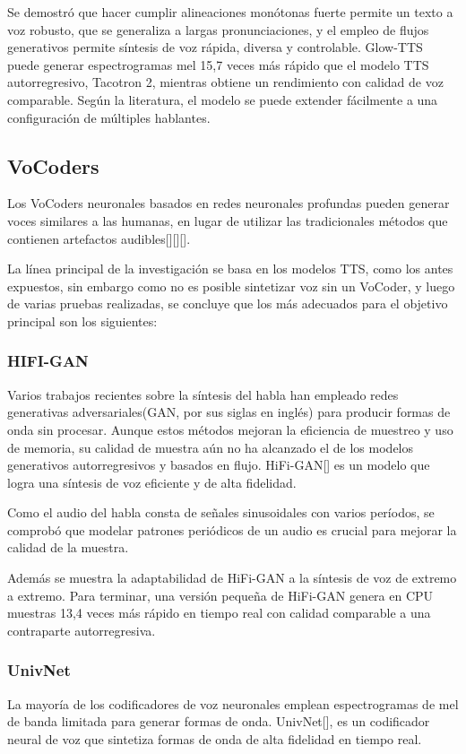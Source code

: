 Se demostró que hacer cumplir alineaciones monótonas fuerte permite un texto a voz robusto, que se generaliza a largas pronunciaciones, y el empleo de flujos generativos permite síntesis de voz rápida, diversa y controlable. Glow-TTS puede generar espectrogramas mel 15,7 veces más rápido que el modelo TTS autorregresivo,
Tacotron 2, mientras obtiene un rendimiento con calidad de voz comparable. Según la literatura, el modelo se puede extender fácilmente a una configuración de múltiples hablantes.


\subsection{VoCoders}
  Los VoCoders neuronales basados en redes neuronales profundas pueden generar voces similares a las humanas, en lugar de utilizar las tradicionales
  métodos que contienen artefactos audibles[\cite{griffin1984signal}][\cite{kawahara1999restructuring}][\cite{morise2016world}]. 
  
  La línea principal de la investigación se basa en los modelos TTS, como los antes expuestos, sin embargo como no es posible sintetizar voz sin un VoCoder, y luego de varias pruebas realizadas, se concluye que los más adecuados para el objetivo principal son los siguientes:
  
\subsubsection{HIFI-GAN}
Varios trabajos recientes sobre la síntesis del habla han empleado redes generativas adversariales(GAN, por sus siglas en inglés) para producir formas de onda sin procesar. Aunque estos métodos mejoran la eficiencia de muestreo y uso de memoria, su calidad de muestra aún no ha alcanzado el de los modelos generativos autorregresivos y basados en flujo. HiFi-GAN[\cite{kong2020hifi}] es un modelo que logra una síntesis de voz eficiente y de alta fidelidad.

Como el audio del habla consta de señales sinusoidales con varios períodos, se comprobó que modelar patrones periódicos de un audio es crucial para mejorar la calidad de la muestra.

Además se muestra la adaptabilidad de HiFi-GAN a la síntesis de voz de extremo a extremo. Para terminar, una versión pequeña de HiFi-GAN genera en CPU muestras 13,4 veces más rápido en tiempo real con calidad comparable a una contraparte autorregresiva.


\subsubsection{UnivNet}
La mayoría de los codificadores de voz neuronales emplean espectrogramas de mel de banda limitada para generar formas de onda. UnivNet[\cite{jang2021univnet}], es un codificador neural de voz que sintetiza formas de onda de alta fidelidad en tiempo real. 

